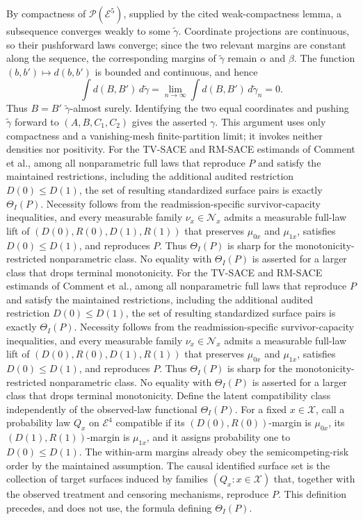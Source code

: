 By compactness of \(\mathcal P(\mathcal E^5)\), supplied by the cited weak-compactness lemma, a subsequence converges weakly to some \(\widetilde\gamma\).  Coordinate projections are continuous, so their pushforward laws converge; since the two relevant margins are constant along the sequence, the corresponding margins of \(\widetilde\gamma\) remain \(\alpha\) and \(\beta\).  The function \((b,b')\mapsto d(b,b')\) is bounded and continuous, and hence
\[
 \int d(B,B')\,d\widetilde\gamma
 =\lim_{n\to\infty}\int d(B,B')\,d\widetilde\gamma_n=0.
\]
Thus \(B=B'\) \(\widetilde\gamma\)-almost surely.  Identifying the two equal coordinates and pushing \(\widetilde\gamma\) forward to \((A,B,C_1,C_2)\) gives the asserted \(\gamma\).  This argument uses only compactness and a vanishing-mesh finite-partition limit; it invokes neither densities nor positivity.
For the TV-SACE and RM-SACE estimands of Comment et al., among all nonparametric full laws that reproduce \(P\) and satisfy the maintained restrictions, including the additional audited restriction \(D(0)\leq D(1)\), the set of resulting standardized surface pairs is exactly \(\Theta_I(P)\).  Necessity follows from the readmission-specific survivor-capacity inequalities, and every measurable family \(\nu_x\in\mathcal N_x\) admits a measurable full-law lift of \((D(0),R(0),D(1),R(1))\) that preserves \(\mu_{0x}\) and \(\mu_{1x}\), satisfies \(D(0)\leq D(1)\), and reproduces \(P\).  Thus \(\Theta_I(P)\) is sharp for the monotonicity-restricted nonparametric class.  No equality with \(\Theta_I(P)\) is asserted for a larger class that drops terminal monotonicity.
For the TV-SACE and RM-SACE estimands of Comment et al., among all nonparametric full laws that reproduce \(P\) and satisfy the maintained restrictions, including the additional audited restriction \(D(0)\leq D(1)\), the set of resulting standardized surface pairs is exactly \(\Theta_I(P)\).  Necessity follows from the readmission-specific survivor-capacity inequalities, and every measurable family \(\nu_x\in\mathcal N_x\) admits a measurable full-law lift of \((D(0),R(0),D(1),R(1))\) that preserves \(\mu_{0x}\) and \(\mu_{1x}\), satisfies \(D(0)\leq D(1)\), and reproduces \(P\).  Thus \(\Theta_I(P)\) is sharp for the monotonicity-restricted nonparametric class.  No equality with \(\Theta_I(P)\) is asserted for a larger class that drops terminal monotonicity.
Define the latent compatibility class independently of the observed-law functional \(\Theta_I(P)\).  For a fixed \(x\in\mathcal X\), call a probability law \(Q_x\) on \(\mathcal E^4\) compatible if its \((D(0),R(0))\)-margin is \(\mu_{0x}\), its \((D(1),R(1))\)-margin is \(\mu_{1x}\), and it assigns probability one to \(D(0)\leq D(1)\).  The within-arm margins already obey the semicompeting-risk order by the maintained assumption.  The causal identified surface set is the collection of target surfaces induced by families \((Q_x:x\in\mathcal X)\) that, together with the observed treatment and censoring mechanisms, reproduce \(P\).  This definition precedes, and does not use, the formula defining \(\Theta_I(P)\).

